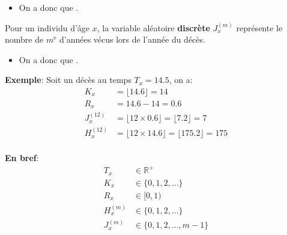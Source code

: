 \documentclass[10pt, french]{article}
\begin{document}
\begin{multicols*}{3}
\begin{definitionNOHFILLsub}
\begin{itemize}
	\item	On a donc que .
\end{itemize}
\end{definitionNOHFILLsub}


\begin{definitionNOHFILLsub}
Pour un individu d'âge $x$, la variable aléatoire \textbf{discrète} $J^{(m)}_{x}$ représente le nombre de $m^{\text{e}}$ d'années vécus lors de l'année du décès.\\

\begin{itemize}
	\item	On a donc que .
\end{itemize}
\end{definitionNOHFILLsub}

\textbf{Exemple}:	Soit un décès au temps $T_{x} = 14.5$, on a:
\begin{align*}
	K_{x}	
	&=	\lfloor	14.6	\rfloor	
	=	14	\\
	R_{x}
	&=	14.6 - 14
	=	0.6	\\
	J^{(12)}_{x}
	&=	\lfloor	12 \times 0.6	\rfloor	
	=	\lfloor	7.2	\rfloor	
	=	7	\\
	H^{(12)}_{x}
	&=	\lfloor	12 \times 14.6	\rfloor	
	=	\lfloor	175.2	\rfloor	
	=	175		\\
\end{align*}

\textbf{En bref}:
\begin{align*}
	T_{x} 
	&\in	\mathbb{R}^{+}	\\
	K_{x} 
	&\in	\{0, 1, 2, \dots\}	\\
	R_{x} 
	&\in	[0, 1)	\\
	H^{(m)}_{x} 
	&\in	\{0, 1, 2, \dots\}	\\
	J^{(m)}_{x} 
	&\in	\{0, 1, 2, \dots, m - 1\}
\end{align*}



\end{multicols*}
\end{document}
